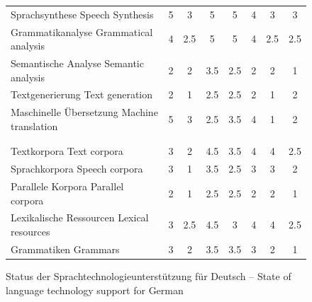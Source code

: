 \documentclass[]{../../metanetpaper}
\begin{document}
\begin{Parallel}[c]{79mm}{78mm}
\begin{figure}
\begin{tabular}{>{\columncolor{orange1}}p{.33\linewidth}@{\hspace*{6mm}}c@{\hspace*{6mm}}c@{\hspace*{6mm}}c@{\hspace*{6mm}}c@{\hspace*{6mm}}c@{\hspace*{6mm}}c@{\hspace*{6mm}}c}
Sprachsynthese \newline Speech Synthesis&5&3&5&5&4&3&3\\ \addlinespace
Grammatikanalyse \newline Grammatical analysis&4&2.5&5&5&4&2.5&2.5\\ \addlinespace
Semantische Analyse \newline Semantic analysis&2&2&3.5&2.5&2&2&1\\ \addlinespace
Textgenerierung \newline Text generation&2&1&2.5&2.5&2&1&2\\ \addlinespace
Maschinelle Übersetzung \newline Machine translation&5&3&2.5&3.5&4&1&2\\ \addlinespace
\multicolumn{8}{>{\columncolor{orange2}}l}{Sprachressourcen: Ressourcen, Daten und Wissensbanken} \\\addlinespace[{-.009cm}]
\multicolumn{8}{>{\columncolor{orange2}}l}{Language Resources: Resources, Data and Knowledge Bases} \\ \addlinespace
Textkorpora \newline Text corpora&3&2&4.5&3.5&4&4&2.5\\ \addlinespace
Sprachkorpora \newline Speech corpora&3&1&3.5&2.5&3&3&2\\ \addlinespace
Parallele Korpora \newline Parallel corpora&2&1&2.5&2.5&2&2&1\\ \addlinespace
Lexikalische Ressourcen \newline Lexical resources&3&2.5&4.5&3&4&4&2.5\\ \addlinespace
Grammatiken \newline Grammars&3&2&3.5&3.5&3&2&1\\
\end{tabular}
\label{tab:lrlttable}
\caption{Status der Sprachtechnologieunterstützung für Deutsch -- State of language technology support for German}
\end{figure}


\end{Parallel}
\end{document}
